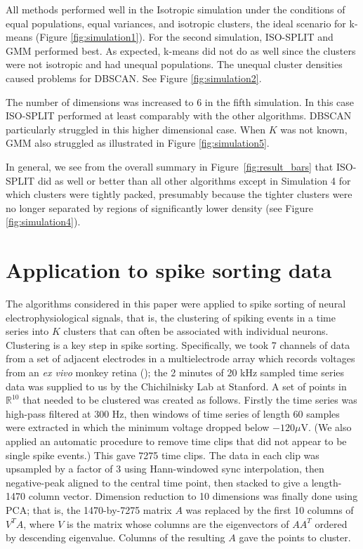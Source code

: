 \documentclass[10pt]{article}
\begin{document}
All methods performed well in the Isotropic simulation under the conditions of equal populations, equal variances, and isotropic clusters, the ideal scenario for k-means (Figure \ref{fig:simulation1}).
For the second simulation, ISO-SPLIT and GMM performed best. As expected, k-means did not do as well since the clusters were not isotropic and had unequal populations. The unequal cluster densities caused problems for DBSCAN. See Figure \ref{fig:simulation2}.

The number of dimensions was increased to $6$ in the fifth simulation. In this case ISO-SPLIT performed at least comparably with the other algorithms. DBSCAN particularly struggled in this higher dimensional case. When $K$ was not known, GMM also struggled as illustrated in Figure \ref{fig:simulation5}.

In general, we see from the overall summary in Figure~\ref{fig:result_bars} that ISO-SPLIT did as well or better than all other algorithms except in Simulation 4 for which clusters were tightly packed, presumably because the tighter clusters were no longer separated by regions of significantly lower density (see Figure \ref{fig:simulation4}).

\section {Application to spike sorting data}
\label{s:spike}

The algorithms considered in this paper were applied to spike sorting of neural electrophysiological signals, that is, the clustering of spiking events in a time series into $K$ clusters that can often be associated with individual neurons. Clustering is a key step in spike sorting. Specifically, we took 7 channels of data from a set of adjacent electrodes in a multielectrode array which records voltages from an {\em ex vivo} monkey retina (\cite{litke}); the 2 minutes of 20 kHz sampled time series data was supplied to us by the Chichilnisky Lab at Stanford. A set of points in $\mathbb{R}^{10}$ that needed to be clustered was created as follows. Firstly the time series was high-pass filtered at 300 Hz, then windows of time series of length 60 samples were extracted in which the minimum voltage dropped below $-120 \mu$V. (We also applied an automatic procedure to remove time clips that did not appear to be single spike events.) This gave 7275 time clips. The data in each clip was upsampled by a factor of 3 using Hann-windowed sync interpolation, then negative-peak aligned to the central time point, then stacked to give a length-1470 column vector. Dimension reduction to 10 dimensions was finally done using PCA; that is, the 1470-by-7275 matrix $A$ was replaced by the first 10 columns of $V^T A$, where $V$ is the matrix whose columns are the eigenvectors of $AA^T$ ordered by descending eigenvalue. Columns of the resulting $A$ gave the points to cluster.
\end{document}
